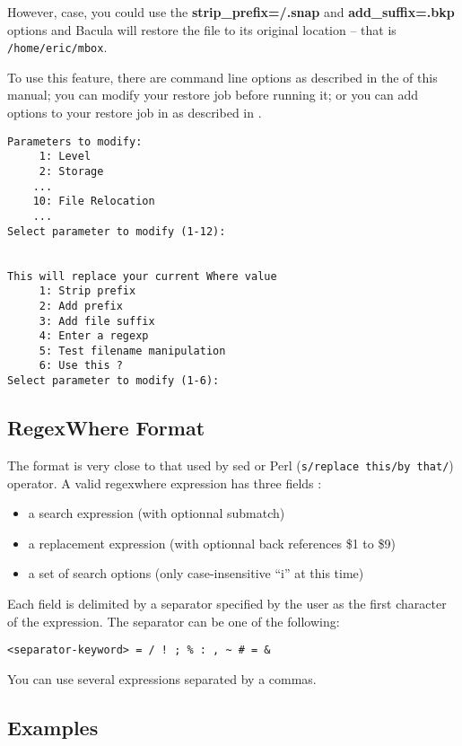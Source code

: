 However, case, you could use the
\textbf{strip\_prefix=/.snap} and \textbf{add\_suffix=.bkp} options and
Bacula will restore the file to its original location -- that is
\texttt{/home/eric/mbox}.

To use this feature, there are command line options as described in 
the  of this manual;
you can modify your restore job before running it; or you can
add options to your restore job in as described in 
.

\begin{verbatim}
Parameters to modify:
     1: Level
     2: Storage
    ...
    10: File Relocation
    ...
Select parameter to modify (1-12):


This will replace your current Where value
     1: Strip prefix
     2: Add prefix
     3: Add file suffix
     4: Enter a regexp
     5: Test filename manipulation
     6: Use this ?
Select parameter to modify (1-6):   
\end{verbatim}


\subsection{RegexWhere Format}

The format is very close to that used by sed or Perl (\texttt{s/replace this/by
  that/}) operator. A valid regexwhere expression has three fields :
\begin{itemize}
\item a search expression (with optionnal submatch)
\item a replacement expression (with optionnal back references \$1 to \$9)
\item a set of search options (only case-insensitive ``i'' at this time)
\end{itemize}

Each field is delimited by a separator specified by the user as the first
character of the expression. The separator can be one of the following:
\begin{verbatim}
<separator-keyword> = / ! ; % : , ~ # = &
\end{verbatim}

You can use several expressions separated by a commas.

\subsection*{Examples}

